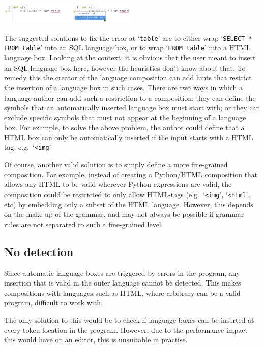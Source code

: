 \documentclass[sigplan,screen]{acmart}\settopmatter{printfolios=true,printccs=false,printacmref=false}
\newcommand{\qtt}[1]{`\texttt{#1}'\xspace}
\begin{document}
\begin{center}
\includegraphics[width=0.5\textwidth]{images/auto_html.png}
\end{center}

The suggested solutions to fix the error at \qtt{table} are to either wrap
\qtt{SELECT * FROM table} into an SQL language box, or to wrap
\qtt{FROM table} into a HTML language box. Looking at the context, it is obvious
that the user meant to insert an SQL language box here, however the heuristics don't
know about that. To remedy this the creator of the language composition can add hints that
restrict the insertion of a language box in such cases. There are two ways in which
a language author can add such a restriction to a composition: they can define
the symbols that an automatically inserted language box must start with;
or they can exclude specific symbols that must not appear at the beginning of a
language box. For example, to solve the above problem, the author could define
that a HTML box can only be automatically inserted if the input starts with a HTML tag,
e.g.~\qtt{<img}.

Of course, another valid solution is to simply define a more
fine-grained composition. For example, instead of creating a Python/HTML
composition that allows any HTML to be valid wherever Python expressions are
valid, the composition could be restricted to only allow HTML-tags
(e.g.~\qtt{<img}, \qtt{<html}, etc) by embedding only a subset of the HTML
language. However, this depends on the make-up of the grammar, and may not
always be possible if grammar rules are not separated to such a fine-grained
level.

\subsection{No detection}

Since automatic language boxes are triggered by errors in the program, any
insertion that is valid in the outer language cannot be detected.  This makes
compositions with languages such as HTML, where arbitrary can be a valid
program, difficult to work with.

The only solution to this would be to check if language boxes can be inserted
at every token location in the program. However, due to the performance impact
this would have on an editor, this is unsuitable in practise.
\end{document}
